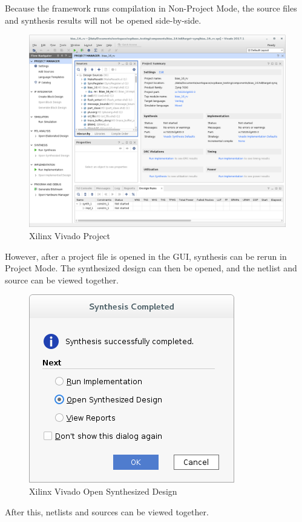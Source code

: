 \begin{flushleft}
Because the framework runs compilation in Non-Project Mode, the source files and synthesis results will not be opened side-by-side.
\begin{figure}[H]
	\centerline{\includegraphics[scale=0.4]{figures/xilinx_vivado_project_view}}
	\caption{Xilinx Vivado Project}
\end{figure}
However, after a project file is opened in the GUI, synthesis can be rerun in Project Mode. The synthesized design can then be opened, and the netlist and source can be viewed together.
\begin{figure}[H]
	\centerline{\includegraphics[scale=0.6]{figures/xilinx_vivado_open_synth}}
	\caption{Xilinx Vivado Open Synthesized Design}
\end{figure}
After this, netlists and sources can be viewed together.
\begin{figure}[H]

\end{figure}
\end{flushleft}
